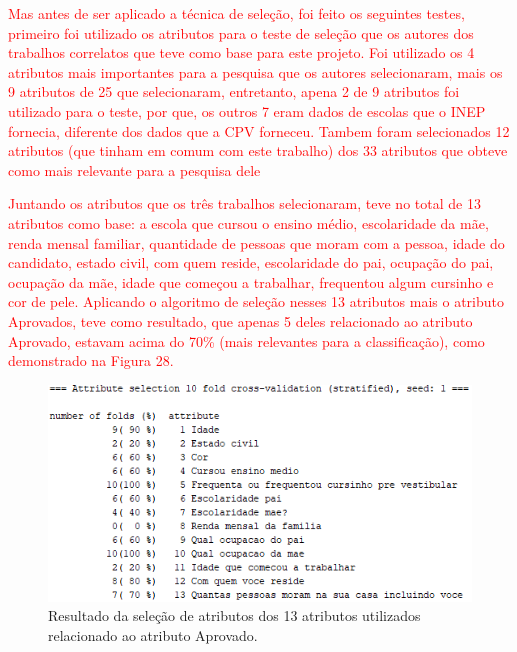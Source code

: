 \par
\textcolor{red}{}



\par
\textcolor{red}{Mas antes de ser aplicado a técnica de seleção, foi feito os seguintes testes, primeiro foi utilizado os atributos para o teste de seleção que os autores dos trabalhos correlatos que teve como base para este projeto. Foi utilizado os 4 atributos mais importantes para a pesquisa que os autores  selecionaram, mais os 9 atributos de 25 que  selecionaram, entretanto, apena 2 de 9 atributos foi utilizado para o teste, por que, os outros 7 eram dados de escolas que o INEP fornecia, diferente dos dados que a CPV forneceu. Tambem foram selecionados 12 atributos (que tinham em comum com este trabalho) dos 33 atributos que  obteve como mais relevante para a pesquisa dele}


\par
\textcolor{red}{Juntando os atributos que os três trabalhos selecionaram, teve no total de 13 atributos como base: a escola que cursou o ensino médio, escolaridade da mãe, renda mensal familiar, quantidade de pessoas que moram com a pessoa, idade do candidato, estado civil, com quem reside, escolaridade do pai, ocupação do pai, ocupação da mãe, idade que começou a trabalhar, frequentou algum cursinho e cor de pele. Aplicando o algoritmo de seleção nesses 13 atributos mais o atributo Aprovados, teve como resultado, que apenas 5 deles relacionado ao atributo Aprovado, estavam acima do 70\%  (mais relevantes para a classificação), como demonstrado na Figura 28.}

\par
\begin{figure}[!htp]
	\begin{center}
    \caption{\label{fig:waveform_fig} Resultado da seleção de atributos dos 13 atributos utilizados relacionado ao atributo Aprovado.}
	\includegraphics[scale=0.99]{Figuras/13_atributos.png}
	\end{center}
\end{figure}

